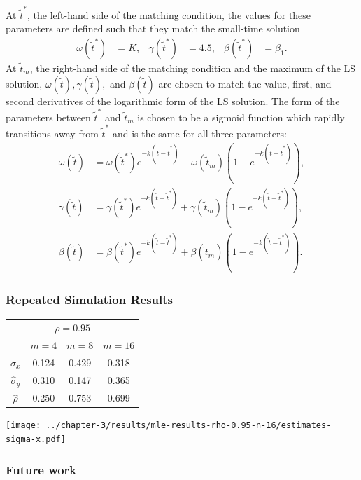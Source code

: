 \documentclass{beamer}
\begin{document}
\begin{frame}
At $\tilde{t}^*$, the
left-hand side of the matching condition, the values for these
parameters are defined such that they match the small-time solution
\begin{align*}
  \omega(\tilde{t}^*) &= K, & \gamma(\tilde{t}^*) &= 4.5, & \beta(\tilde{t}^*) &= \beta_1.
\end{align*}
At $\tilde{t}_m$, the right-hand side of the matching condition and
the maximum of the LS solution,
$\omega(\tilde{t}), \gamma(\tilde{t}),$ and $\beta(\tilde{t})$ are
chosen to match the value, first, and second derivatives of the
logarithmic form of the LS solution. The form of the parameters
between $\tilde{t}^*$ and $\tilde{t}_m$ is chosen to be a sigmoid
function which rapidly transitions away from $\tilde{t}^*$ and is the
same for all three parameters:
\begin{align*}
    \omega(\tilde{t}) &= \omega(\tilde{t}^*)e^{-k(\tilde{t}-\tilde{t}^*)} + \omega(\tilde{t}_m)\left(1-e^{-k(\tilde{t}-\tilde{t}^*)}\right), \\
    \gamma(\tilde{t}) &= \gamma(\tilde{t}^*)e^{-k(\tilde{t}-\tilde{t}^*)} + \gamma(\tilde{t}_m)\left(1-e^{-k(\tilde{t}-\tilde{t}^*)}\right), \\
    \beta(\tilde{t}) &= \beta(\tilde{t}^*)e^{-k(\tilde{t}-\tilde{t}^*)} + \beta(\tilde{t}_m)\left(1-e^{-k(\tilde{t}-\tilde{t}^*)}\right).
\end{align*}
\end{frame}
\begin{frame}
  \centering
  \texttt{[image: ../chapter-3/figures/\{matched-rho-0.95-data-point-4]}.pdf}
\end{frame}
\begin{frame}
  \frametitle{Repeated Simulation Results}
  \begin{table}
  \centering
  \begin{tabular}{cccc}
    \multicolumn{4}{c}{$\rho=0.95$} \\
    & $m=4$ & $m=8$ & $m=16$ \\
    \hline
    $\hat{\sigma}_x$ & 0.124 & 0.429  & 0.318 \\
    \hline
    $\hat{\sigma}_y$ & 0.310 & 0.147  & 0.365 \\
    \hline
    $\hat{\rho}$ & 0.250 & 0.753 & 0.699
  \end{tabular}
\end{table}
\end{frame}

\begin{frame}
\centering
\texttt{[image: ../chapter-3/results/mle-results-rho-0.95-n-16/estimates-sigma-x.pdf]}
\end{frame}

\begin{frame}
  \frametitle{Future work}
\end{frame}
\end{document}
